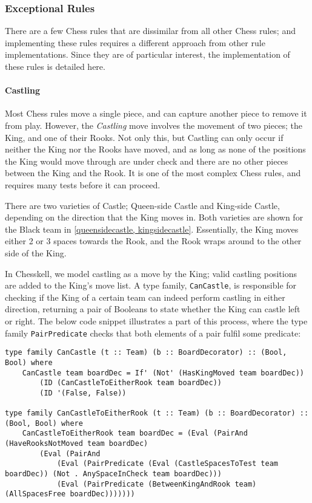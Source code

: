 \documentclass[12pt, a4paper, bibliography=totocnumbered]{scrreprt}
\newcommand{\inline}[1]{\lstinline[basicstyle=\ttfamily\footnotesize]{#1}}
\begin{document}
\subsubsection{Exceptional Rules}

There are a few Chess rules that are dissimilar from all other Chess rules; and implementing these rules requires a different approach from other rule implementations. Since they are of particular interest, the implementation of these rules is detailed here.

\paragraph{Castling} \label{castlesection}

Most Chess rules move a single piece, and can capture another piece to remove it from play. However, the \emph{Castling} move involves the movement of two pieces; the King, and one of their Rooks. Not only this, but Castling can only occur if neither the King nor the Rooks have moved, and as long as none of the positions the King would move through are under check and there are no other pieces between the King and the Rook. It is one of the most complex Chess rules, and requires many tests before it can proceed.

There are two varieties of Castle; Queen-side Castle and King-side Castle, depending on the direction that the King moves in. Both varieties are shown for the Black team in \cref{queensidecastle, kingsidecastle}. Essentially, the King moves either 2 or 3 spaces towards the Rook, and the Rook wraps around to the other side of the King.

In Chesskell, we model castling as a move by the King; valid castling positions are added to the King's move list. A type family, \inline{CanCastle}, is responsible for checking if the King of a certain team can indeed perform castling in either direction, returning a pair of Booleans to state whether the King can castle left or right. The below code snippet illustrates a part of this process, where the type family \inline{PairPredicate} checks that both elements of a pair fulfil some predicate:

\begin{lstlisting}
type family CanCastle (t :: Team) (b :: BoardDecorator) :: (Bool, Bool) where
    CanCastle team boardDec = If' (Not' (HasKingMoved team boardDec))
        (ID (CanCastleToEitherRook team boardDec))
        (ID '(False, False))

type family CanCastleToEitherRook (t :: Team) (b :: BoardDecorator) :: (Bool, Bool) where
    CanCastleToEitherRook team boardDec = (Eval (PairAnd (HaveRooksNotMoved team boardDec)
        (Eval (PairAnd
            (Eval (PairPredicate (Eval (CastleSpacesToTest team boardDec)) (Not . AnySpaceInCheck team boardDec)))
            (Eval (PairPredicate (BetweenKingAndRook team) (AllSpacesFree boardDec)))))))
\end{lstlisting}
\end{document}

